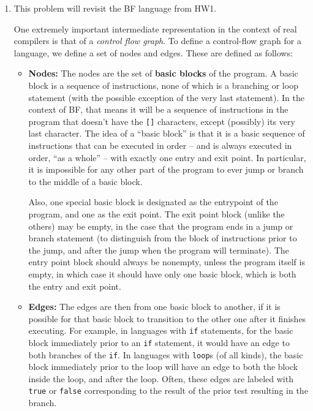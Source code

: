 \documentclass{article}
\theoremstyle{plain}
\begin{document}
\begin{enumerate}
Please name your unit tests \texttt{test\_3b\_1}, \texttt{test\_3b\_2}, and \texttt{test\_3b\_3}. (You may add other unit tests with other names.)


\item
This problem will revisit the BF language from HW1.

One extremely important intermediate representation in the context of real compilers is that of a \emph{control flow graph}.
To define a control-flow graph for a language, we define a set of nodes and edges.
These are defined as follows:
\begin{itemize}
\item \textbf{Nodes:}
The nodes are the set of \textbf{basic blocks} of the program.
A basic block is a sequence of instructions, none of which is a branching or loop statement (with the possible exception of the very last statement).
In the context of BF, that means it will be a sequence of instructions in the program that doesn't have the \texttt{[]} characters, except (possibly) its very last character.
The idea of a ``basic block'' is that it is a basic sequence of instructions that can be executed in order -- and is always executed in order, ``as a whole'' -- with exactly one entry and exit point. In particular, it is impossible for any other part of the program to ever jump or branch to the middle of a basic block.

Also, one special basic block is designated as the entrypoint of the program, and one as the exit point.
The exit point block (unlike the others) may be empty, in the case that the program ends in a jump or branch statement (to distinguish from the block of instructions prior to the jump, and after the jump when the program will terminate).
The entry point block should always be nonempty, unless the program itself is empty, in which case it should have only one basic block, which is both the entry and exit point.

\item \textbf{Edges:}
The edges are then from one basic block to another, if it is possible for that basic block to transition to the other one after it finishes executing.
For example, in languages with \texttt{if} statements, for the basic block immediately prior to an \texttt{if} statement, it would have an edge to both branches of the \texttt{if}. In languages with \texttt{loop}s (of all kinds), the basic block immediately prior to the loop will have an edge to both the block inside the loop, and after the loop.
Often, these edges are labeled with \texttt{true} or \texttt{false} corresponding to the result of the prior test resulting in the branch.
\end{itemize}


\end{enumerate}
\end{document}
